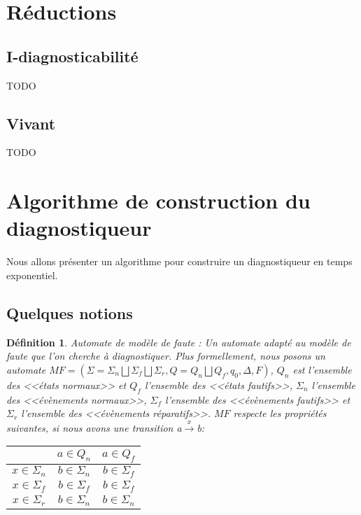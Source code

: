 \documentclass[10pt,a4paper]{article}
\newtheorem {mydef} {D\'efinition}
\begin{document}
\section{R\'eductions}

\subsection{I-diagnosticabilit\'e}

TODO

\subsection{Vivant}

TODO

\section{Algorithme de construction du diagnostiqueur}
    Nous allons présenter un algorithme pour construire un diagnostiqueur en temps exponentiel.
        \subsection{Quelques notions}
   \begin{mydef}{Automate de mod\`ele de faute : }
                Un automate adapté au modèle de faute que l'on cherche à diagnostiquer. Plus formellement, nous posons un automate $MF = (\Sigma = \Sigma_n \bigsqcup \Sigma_f \bigsqcup \Sigma_r, Q = Q_n \bigsqcup Q_f,q_0,\Delta, F)$,  $Q_n$ est l'ensemble des <<\'etats normaux>> et $Q_f$ l'ensemble des <<\'etats fautifs>>, $\Sigma_n$  l'ensemble des <<\'ev\`enements normaux>>, $\Sigma_f$ l'ensemble des  <<\'ev\`enements fautifs>> et $\Sigma_r$ l'ensemble des <<\'ev\`enements r\'eparatifs>>. $MF$ respecte les propri\'et\'es suivantes, si nous avons une transition a$\xrightarrow{x}$b:
                \begin{center}
                \begin{tabular}{|c|c|c|}
                        \hline
                        & $a\in Q_n$ & $a\in Q_f$\\
                        \hline                        
                        $x\in \Sigma_n$ & $b\in \Sigma_n$&$b\in \Sigma_f$\\
                        \hline                        
                        $x\in \Sigma_f$ &$b\in \Sigma_f$&$b\in \Sigma_f$\\
                        \hline
                        $x\in \Sigma_r$ & $b\in \Sigma_n$ & $b \in \Sigma_n$\\
                        \hline
                \end{tabular}
                \end{center}
    \end{mydef}
    
\end{document}
